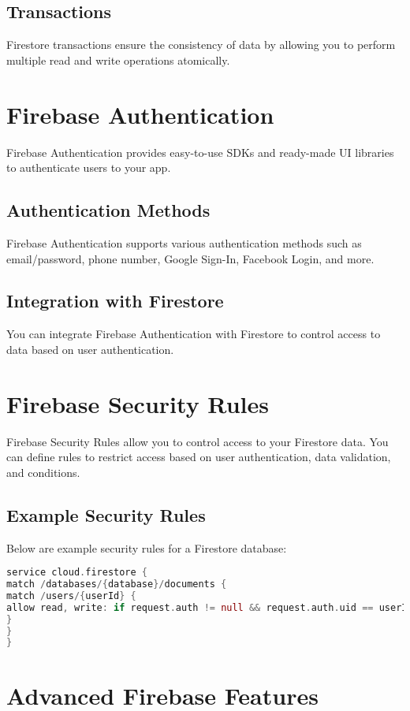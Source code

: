 \documentclass[12pt]{article}
\begin{document}
\subsection{Transactions}
Firestore transactions ensure the consistency of data by allowing you to perform multiple read and write operations atomically.

\section{Firebase Authentication}
Firebase Authentication provides easy-to-use SDKs and ready-made UI libraries to authenticate users to your app.

\subsection{Authentication Methods}
Firebase Authentication supports various authentication methods such as email/password, phone number, Google Sign-In, Facebook Login, and more.

\subsection{Integration with Firestore}
You can integrate Firebase Authentication with Firestore to control access to data based on user authentication.

\section{Firebase Security Rules}
Firebase Security Rules allow you to control access to your Firestore data. You can define rules to restrict access based on user authentication, data validation, and conditions.

\subsection{Example Security Rules}
Below are example security rules for a Firestore database:
\begin{lstlisting}[language=Dart, caption={Example Firestore Security Rules}]
service cloud.firestore {
match /databases/{database}/documents {
match /users/{userId} {
allow read, write: if request.auth != null && request.auth.uid == userId;
}
}
}
\end{lstlisting}



\newpage

\section{Advanced Firebase Features}
\end{document}
